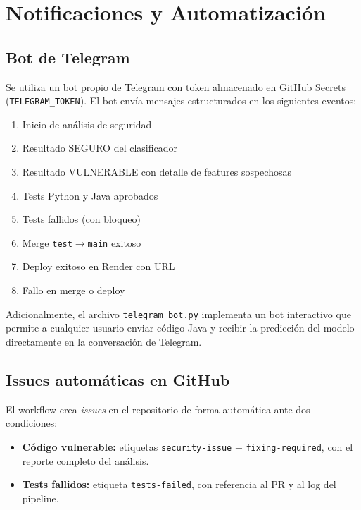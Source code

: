 \documentclass[12pt,a4paper]{article}
\begin{document}
\section{Notificaciones y Automatización}

\subsection{Bot de Telegram}

Se utiliza un bot propio de Telegram con token almacenado en GitHub Secrets (\texttt{TELEGRAM\_TOKEN}). El bot envía mensajes estructurados en los siguientes eventos:

\begin{enumerate}
  \item Inicio de análisis de seguridad
  \item Resultado SEGURO del clasificador
  \item Resultado VULNERABLE con detalle de features sospechosas
  \item Tests Python y Java aprobados
  \item Tests fallidos (con bloqueo)
  \item Merge \texttt{test}$\to$\texttt{main} exitoso
  \item Deploy exitoso en Render con URL
  \item Fallo en merge o deploy
\end{enumerate}

Adicionalmente, el archivo \texttt{telegram\_bot.py} implementa un bot interactivo que permite a cualquier usuario enviar código Java y recibir la predicción del modelo directamente en la conversación de Telegram.

\subsection{Issues automáticas en GitHub}

El workflow crea \textit{issues} en el repositorio de forma automática ante dos condiciones:

\begin{itemize}
  \item \textbf{Código vulnerable:} etiquetas \texttt{security-issue} + \texttt{fixing-required}, con el reporte completo del análisis.
  \item \textbf{Tests fallidos:} etiqueta \texttt{tests-failed}, con referencia al PR y al log del pipeline.
\end{itemize}
\end{document}
